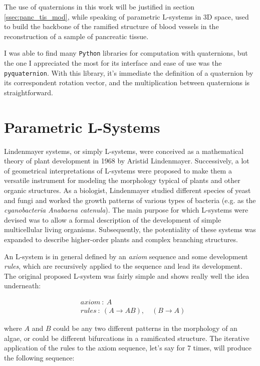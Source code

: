     The use of quaternions in this work will be justified in section \ref{ssec:panc_tis_mod}, while speaking of parametric L-systems in 3D space, used to build the backbone of the ramified structure of blood vessels in the reconstruction of a sample of pancreatic tissue.

    I was able to find many \texttt{Python} libraries for computation with quaternions, but the one I appreciated the most for its interface and ease of use was the \texttt{pyquaternion}. With this library, it's immediate the definition of a quaternion by its correspondent rotation vector, and the multiplication between quaternions is straightforward.

\section{Parametric L-Systems} \label{ssec:Lsys}
    Lindenmayer systems, or simply L-systems,  were conceived as a mathematical theory of plant development \cite{lindenmayer1968mathematical} in 1968 by Aristid Lindenmayer. Successively, a lot of geometrical interpretations of L-systems were proposed to make them a versatile instrument for modeling the morphology typical of plants and other organic structures. As a biologist, Lindenmayer studied different species of yeast and fungi and worked the growth patterns of various types of bacteria (e.g. as the \textit{cyanobacteria Anabaena catenula}). The main purpose for which L-systems were devised was to allow a formal description of the development of simple multicellular living organisms. Subsequently, the potentiality of these systems was expanded to describe higher-order plants and complex branching structures.

    An L-system is in general defined by an \textit{axiom} sequence and some development \textit{rules}, which are recursively applied to the sequence and lead its development. The original proposed L-system was fairly simple and shows really well the idea underneath:

    \begin{align}
        & axiom\ :\ A \nonumber \\
        & rules\ :\ (A \rightarrow AB),\quad(B \rightarrow A) \nonumber
    \end{align}

    where $A$ and $B$ could be any two different patterns in the morphology of an algae, or could be different bifurcations in a ramificated structure. The iterative application of the rules to the axiom sequence, let's say for 7 times, will produce the following sequence:

